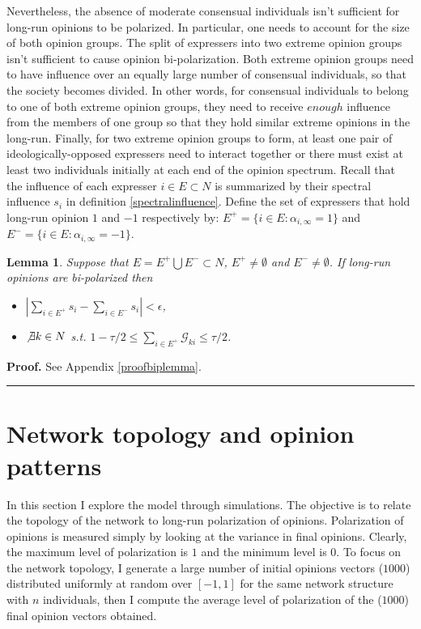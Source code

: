 \documentclass{article}
\newtheorem{lemma}{Lemma}
\newenvironment{proof}[1][Proof]{\textbf{#1.} }{\ \rule{0.5em}{0.5em}}
\begin{document}
Nevertheless, the absence of moderate consensual individuals isn't sufficient for long-run opinions to be polarized. In particular, one needs to account for the size of both opinion groups. The split of expressers into two extreme opinion groups isn't sufficient to cause opinion bi-polarization. Both extreme opinion groups need to have influence over an equally large number of consensual individuals, so that the society becomes divided. In other words, for consensual individuals to belong to one of both extreme opinion groups, they need to receive $enough$ influence from the members of one group so that they hold similar extreme opinions in the long-run.  Finally, for two extreme opinion groups to form, at least one pair of ideologically-opposed expressers need to interact together or there must exist at least two individuals initially at each end of the opinion spectrum. Recall that the influence of each expresser $i \in E \subset N$  is summarized by their spectral influence $s_i$ in definition \ref{spectralinfluence}. Define the set of expressers that hold long-run opinion $1$ and $-1$ respectively by: $E^{+} =\{ i \in E:  \alpha_{i, \infty}=1\}$ and $E^{-} =\{ i \in E:  \alpha_{i, \infty}=-1\}$.

\begin{lemma}
Suppose that $E=E^{+} \bigcup E^{-} \subset N$, $E^{+} \neq \emptyset$ and $E^{-} \neq \emptyset$.   If long-run opinions are bi-polarized then \begin{itemize} \item[(i)] $ | \sum_{i \in E^{+} } s_i - \sum_{i \in E^{-}} s_i | < \epsilon $,
\item[(ii)] $\not\exists k \in N$ s.t. $1 - \tau/2 \leq \sum_{i \in E^{+}} \mathcal{G}_{ki} \leq \tau/2$.
\end{itemize}
\label{biplemma}
\end{lemma}

\noindent \begin{proof} See Appendix \ref{proofbiplemma}.\end{proof}

\section{Network topology and opinion patterns} \label{simulations}

In this section I explore the model through simulations. The objective is to relate the topology of the network to long-run polarization of opinions. Polarization of opinions is measured simply by looking at the variance in final opinions. Clearly, the maximum level of polarization is $1$ and the minimum level is $0$. To focus on the network topology, I generate a large number of initial opinions vectors ($1000$) distributed uniformly at random over $[-1,1]$  for the same network structure with $n$ individuals, then I compute the average level of polarization of the ($1000$) final opinion vectors obtained.  
\end{document}
